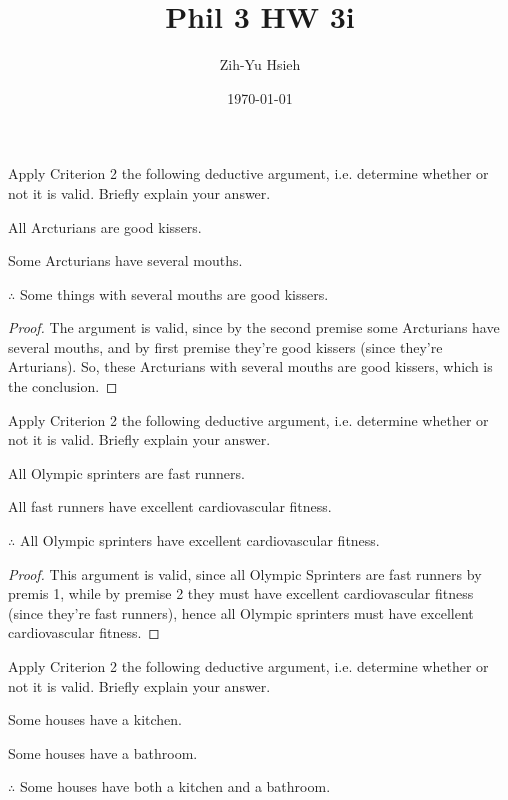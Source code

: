 \documentclass{article}
\title{Phil 3 HW 3i}
\author{Zih-Yu Hsieh}
\date{\today}
\begin{document}
\maketitle

\begin{ques}\label{q1}
Apply Criterion 2 the following deductive argument, i.e. determine
whether or not it is valid. Briefly explain your answer.

All Arcturians are good kissers.

Some Arcturians have several mouths.

$\therefore$ Some things with several mouths are good kissers.
\end{ques}

\begin{proof}
    The argument is valid, since by the second premise some Arcturians have several mouths, and by first premise they're good kissers (since they're Arturians). So, these Arcturians with several mouths are good kissers, which is the conclusion.
\end{proof}

\hfil

\begin{ques}\label{q2}
Apply Criterion 2 the following deductive argument, i.e. determine
whether or not it is valid. Briefly explain your answer.

All Olympic sprinters are fast runners.

All fast runners have excellent cardiovascular fitness.

$\therefore$ All Olympic sprinters have excellent cardiovascular fitness.
\end{ques}

\begin{proof}
    This argument is valid, since all Olympic Sprinters are fast runners by premis 1, while by premise 2 they must have excellent cardiovascular fitness (since they're fast runners), hence all Olympic sprinters must have excellent cardiovascular fitness.
\end{proof}

\hfil

\begin{ques}\label{q3}
Apply Criterion 2 the following deductive argument, i.e. determine
whether or not it is valid. Briefly explain your answer.

Some houses have a kitchen.

Some houses have a bathroom.

$\therefore$ Some houses have both a kitchen and a bathroom.
\end{ques}
\end{document}
